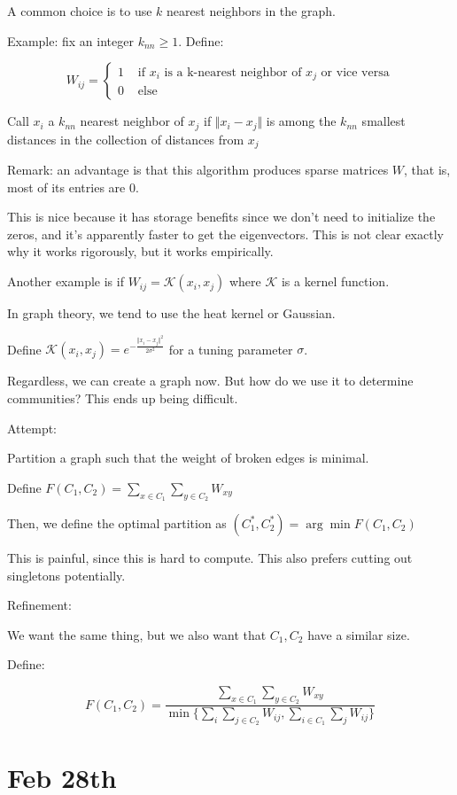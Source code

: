 \documentclass[10pt]{article}
\begin{document}
A common choice is to use $k$ nearest neighbors in the graph.

Example: fix an integer $k_{nn} \geq 1$. Define:

$$ W_{ij} = \begin{cases} 1 & \text{ if } x_i \text{ is a k-nearest neighbor of } x_j \text{ or vice versa} \\ 0 & \text{ else} \end{cases} $$

Call $x_i$ a $k_{nn}$ nearest neighbor of $x_j$ if $\Vert x_i - x_j \Vert$ is among the $k_{nn}$ smallest distances in the collection of distances from $x_j$

Remark: an advantage is that this algorithm produces sparse matrices $W$, that is, most of its entries are 0.

This is nice because it has storage benefits since we don’t need to initialize the zeros, and it’s apparently faster to get the eigenvectors. This is not clear exactly why it works rigorously, but it works empirically.

Another example is if $W_{ij} = \mathcal{K}(x_i,x_j)$ where $\mathcal{K}$ is a kernel function.

In graph theory, we tend to use the heat kernel or Gaussian.

Define $ \mathcal{K}(x_i,x_j) = e^{- \frac{\Vert x_i - x_j \Vert^2}{2\sigma^2}}$ for a tuning parameter $\sigma$.

Regardless, we can create a graph now. But how do we use it to determine communities? This ends up being difficult.

Attempt:

Partition a graph such that the weight of broken edges is minimal.

Define $F(C_1,C_2) = \sum_{x \in C_1} \sum_{y \in C_2} W_{xy} $

Then, we define the optimal partition as $(C_1^*, C_2^*)  = \arg \min F(C_1,C_2) $

This is painful, since this is hard to compute. This also prefers cutting out singletons potentially.

Refinement:

We want the same thing, but we also want that $C_1, C_2$ have a similar size. 

Define:

$$F(C_1,C_2) = \frac{\sum_{x \in C_1} \sum_{y \in C_2} W_{xy} }{\min \{ \sum_i \sum_{j \in C_2} W_{ij}, \sum_{i \in C_1} \sum_{j } W_{ij}\}}$$

\section*{Feb 28th}
\end{document}
